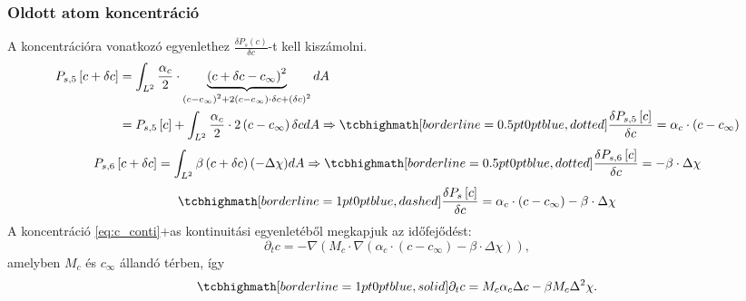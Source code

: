 \documentclass[10pt,a4paper]{scrartcl}
\begin{document}
\subsubsection{Oldott atom koncentráció} A koncentrációra vonatkozó egyenlethez $\frac{{\delta {P_s}\left( c \right)}}{{\delta c}}$-t kell kiszámolni.
\begin{align}
  {P_{s,5}}\left[ {c + \delta c} \right] &  = \int_{{L^2}} {\frac{\alpha_c}{2}  \cdot \underbrace {{{\left( {c + \delta c - {c_\infty }} \right)}^2}}_{{{\left( {c - {c_\infty }} \right)}^2} + 2\left( {c - {c_\infty }} \right) \cdot \delta c + {{\left( {\delta c} \right)}^2}}dA} \nonumber \\ 
   &  = {P_{s,5}}\left[ c \right] + \int_{{L^2}} {\frac{\alpha_c}{2}  \cdot 2\left( {c - {c_\infty }} \right)\delta cdA}  \Rightarrow\tcbhighmath[borderline={0.5pt}{0pt}{blue,dotted}]{ \frac{{\delta {P_{s,5}}\left[ c \right]}}{{\delta c}} = \alpha_c  \cdot \left( {c - {c_\infty }} \right)}
\end{align}
\begin{equation}
{P_{s,6}}\left[ {c + \delta c} \right] = \int_{{L^2}} {\beta \left( {c + \delta c} \right)\left( { - \Delta \chi } \right)} dA \Rightarrow \tcbhighmath[borderline={0.5pt}{0pt}{blue,dotted}]{\frac{{\delta {P_{s,6}}\left[ c \right]}}{{\delta c}} =  - \beta  \cdot \Delta \chi}
\end{equation}
\begin{equation} \label{eq:c_pot}
\tcbhighmath[borderline={1pt}{0pt}{blue,dashed}]{\frac{{\delta {P_s}\left[ c \right]}}{{\delta c}} = \alpha_c  \cdot \left( {c - {c_\infty }} \right) - \beta  \cdot \Delta \chi }
\end{equation}
A koncentráció \told\ref{eq:c_conti}+as{} kontinuitási egyenletéből megkapjuk az időfejődést:
\[\partial_t c =  - \nabla \left( {{M_c} \cdot \nabla \left( {{\alpha _c} \cdot \left( {c - {c_\infty }} \right) - \beta  \cdot \Delta \chi } \right)} \right),\]
amelyben $M_c$ és $c_{\infty}$ állandó térben, így
\begin{equation} \label{eq:c}
\tcbhighmath[borderline={1pt}{0pt}{blue,solid}]{
\partial_t c =  {M_c}{\alpha _c}\Delta c - \beta {M_c}\Delta^2 \chi.}
\end{equation}
\end{document}

